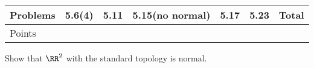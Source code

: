 \documentclass{fkpset}
\begin{document}
\pagestyle{plain}
\pagestyle{fancy}
  \vspace{-2.9cm}
  \begin{table}[H]
    \centering
    \begin{tabular}{@{}lcccccr@{}}\toprule
      Problems & 5.6(4) & 5.11 & 5.15(no normal) & 5.17 & 5.23 & Total \\ \midrule
      Points   &        &      &                 &      &      &       \\ \bottomrule
    \end{tabular}
  \end{table}
  \vspace{1cm}

  \begin{problem}[5.6(4)]
    Show that $\RR^2$ with the standard topology is normal.
  \end{problem}
\end{document}
